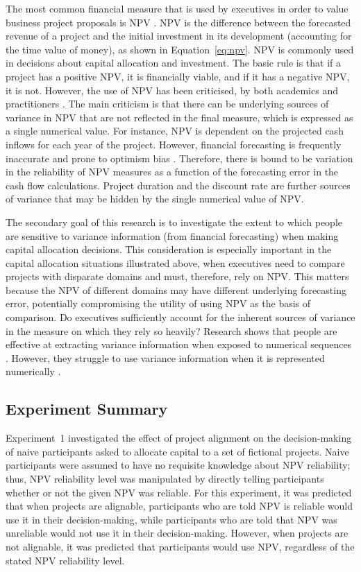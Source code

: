 \documentclass[a4paper, nobind]{templates/ociamthesis}
\theoremstyle{definition}
\theoremstyle{definition}
\theoremstyle{definition}
\theoremstyle{definition}
\theoremstyle{remark}
\begin{document}
The most common financial measure that is used by executives in order to value
business project proposals is NPV \autocite{graham2001,remer1993,graham2015}. NPV is
the difference between the forecasted revenue of a project and the initial
investment in its development (accounting for the time value of money), as shown
in Equation~\eqref{eq:npv}. NPV is commonly used in decisions about capital
allocation and investment. The basic rule is that if a project has a positive
NPV, it is financially viable, and if it has a negative NPV, it is not. However,
the use of NPV has been criticised, by both academics and practitioners
\autocite{fox2008,willigers2017}. The main criticism is that there can be underlying
sources of variance in NPV that are not reflected in the final measure, which is
expressed as a single numerical value. For instance, NPV is dependent on the
projected cash inflows for each year of the project. However, financial
forecasting is frequently inaccurate and prone to optimism bias \autocite{lovallo2003,puri2007}. Therefore, there is bound to be variation in the reliability of NPV
measures as a function of the forecasting error in the cash flow calculations.
Project duration and the discount rate are further sources of variance that may
be hidden by the single numerical value of NPV.

The secondary goal of this research is to investigate the extent to which people
are sensitive to variance information (from financial forecasting) when making
capital allocation decisions. This consideration is especially important in the
capital allocation situations illustrated above, when executives need to compare
projects with disparate domains and must, therefore, rely on NPV. This matters
because the NPV of different domains may have different underlying forecasting
error, potentially compromising the utility of using NPV as the basis of
comparison. Do executives sufficiently account for the inherent sources of
variance in the measure on which they rely so heavily? Research shows that
people are effective at extracting variance information when exposed to
numerical sequences \autocite{rosenbaum2020}. However, they struggle to use variance
information when it is represented numerically \autocite{galesic2010,konold1993,vivalt2021,batteux2020}.

\subsection{Experiment Summary}

Experiment~1 investigated the effect of project alignment on the decision-making
of naive participants asked to allocate capital to a set of fictional projects.
Naive participants were assumed to have no requisite knowledge about NPV
reliability; thus, NPV reliability level was manipulated by directly telling
participants whether or not the given NPV was reliable. For this experiment, it
was predicted that when projects are alignable, participants who are told NPV is
reliable would use it in their decision-making, while participants who are told
that NPV was unreliable would not use it in their decision-making. However, when
projects are not alignable, it was predicted that participants would use NPV,
regardless of the stated NPV reliability level.
\end{document}
